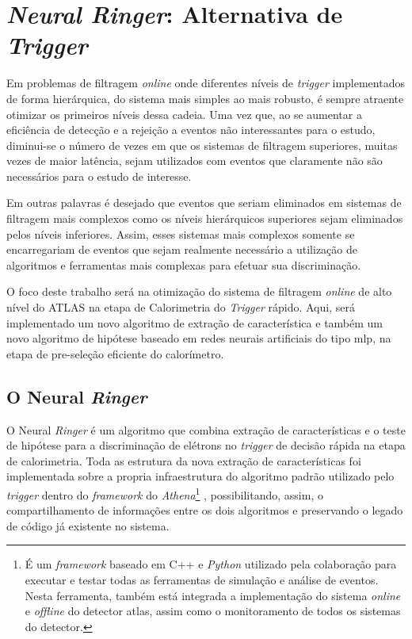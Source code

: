 

\chapter{\textit{Neural Ringer}: Alternativa de \textit{Trigger}}
\label{cap:metodologia}
\glsresetall

Em problemas de filtragem \textit{online} onde diferentes níveis de \textit{trigger} implementados de forma hierárquica, do sistema mais simples
ao mais robusto, é sempre atraente otimizar os primeiros níveis dessa cadeia. Uma vez que, ao se aumentar a eficiência de detecção
e a rejeição a eventos não interessantes para o estudo, diminui-se o número de vezes em que os sistemas de filtragem superiores,
muitas vezes de maior latência, sejam utilizados com eventos que claramente não são necessários para o estudo de interesse.

Em outras palavras é desejado que eventos que seriam eliminados em sistemas de filtragem mais complexos como os níveis 
hierárquicos superiores sejam eliminados pelos níveis inferiores. Assim, esses sistemas mais complexos somente se encarregariam
de eventos que sejam realmente necessário a utilização de algoritmos e ferramentas mais complexas para efetuar sua discriminação.

O foco deste trabalho será na otimização do sistema de filtragem \textit{online} de alto nível do ATLAS na etapa de Calorimetria do \textit{Trigger} rápido.
Aqui, será implementado um novo algoritmo de extração de característica e também um novo algoritmo de hipótese baseado em redes neurais artificiais 
do tipo \gls{mlp}, na etapa de pre-seleção eficiente do calorímetro.

\newpage
\section{O Neural \textit{Ringer}}

O Neural \textit{Ringer} é um algoritmo que combina extração de características e o teste de hipótese para a discriminação de elétrons no \textit{trigger} de decisão rápida na etapa
de calorimetria. Toda as estrutura da nova extração de características foi implementada sobre a propria infraestrutura do algoritmo padrão utilizado pelo \textit{trigger} dentro
do \textit{framework} do
\textit{Athena}\footnote{É um \textit{framework} baseado em C++ e \textit{Python} utilizado pela colaboração para executar e testar todas as ferramentas de simulação e 
análise de eventos. Nesta ferramenta, também está integrada a implementação do sistema \textit{online} e \textit{offline} do detector \gls{atlas}, assim como o 
monitoramento de todos os sistemas do detector.}
, possibilitando, assim, o compartilhamento de informações entre os dois algoritmos e preservando o legado de código já existente no sistema.


